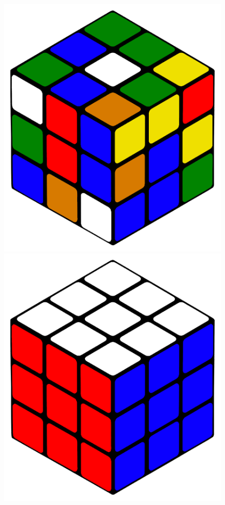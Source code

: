 \documentclass[12pt,a4paper, usenames, dvipsnames]{scrartcl}
\begin{document}
\begin{figure}[h]
\includegraphics[scale=0.09]{3x3scrambled.png}
\includegraphics[scale=0.09]{3x3solved.png}
\end{figure}
\end{document}
